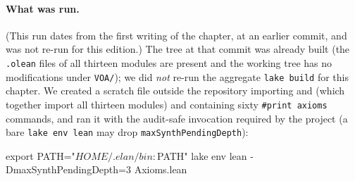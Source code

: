 \paragraph{What was run.} (This run dates from the first writing of the chapter, at an earlier commit, and was not re-run for this edition.) The tree at that commit was already built (the \texttt{.olean} files of all thirteen
modules are present and the working tree has no modifications under \texttt{VOA/}); we did \emph{not} re-run the aggregate
\texttt{lake build} for this chapter. We created a scratch file outside the repository importing
 and  (which together import all
thirteen modules) and containing sixty \texttt{\#print axioms} commands, and ran it with the audit-safe invocation required
by the project (a bare \texttt{lake env lean} may drop \texttt{maxSynthPendingDepth}):
\begin{plaincode}
export PATH="$HOME/.elan/bin:$PATH"
lake env lean -DmaxSynthPendingDepth=3 Axioms.lean
\end{plaincode}

